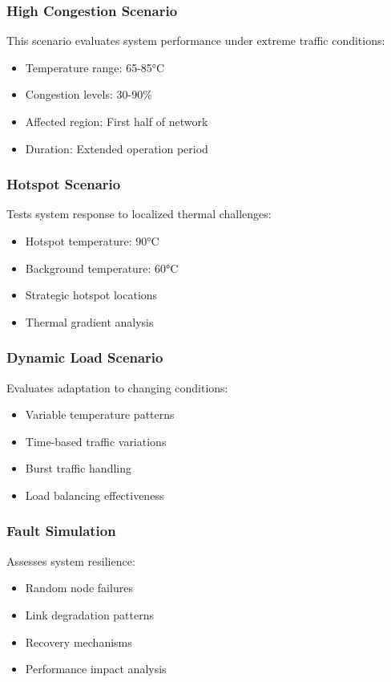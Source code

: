 \documentclass[12pt]{article}
\begin{document}
\subsubsection{High Congestion Scenario}
This scenario evaluates system performance under extreme traffic conditions:
\begin{itemize}[noitemsep]
    \item Temperature range: 65-85°C
    \item Congestion levels: 30-90\%
    \item Affected region: First half of network
    \item Duration: Extended operation period
\end{itemize}

\subsubsection{Hotspot Scenario}
Tests system response to localized thermal challenges:
\begin{itemize}[noitemsep]
    \item Hotspot temperature: 90°C
    \item Background temperature: 60°C
    \item Strategic hotspot locations
    \item Thermal gradient analysis
\end{itemize}

\subsubsection{Dynamic Load Scenario}
Evaluates adaptation to changing conditions:
\begin{itemize}[noitemsep]
    \item Variable temperature patterns
    \item Time-based traffic variations
    \item Burst traffic handling
    \item Load balancing effectiveness
\end{itemize}

\subsubsection{Fault Simulation}
Assesses system resilience:
\begin{itemize}[noitemsep]
    \item Random node failures
    \item Link degradation patterns
    \item Recovery mechanisms
    \item Performance impact analysis
\end{itemize}
\end{document}
